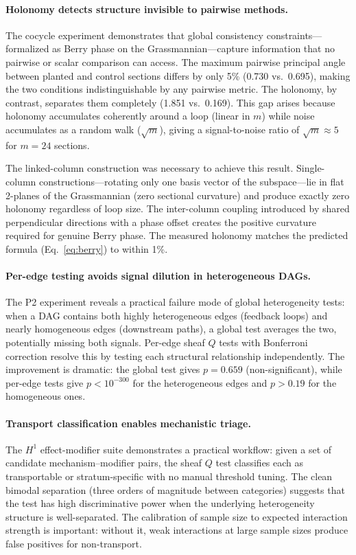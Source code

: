 \documentclass[11pt]{article}
\begin{document}
\paragraph{Holonomy detects structure invisible to pairwise methods.}
The cocycle experiment demonstrates that global consistency
constraints---formalized as Berry phase on the
Grassmannian---capture information that no pairwise or scalar comparison
can access. The maximum pairwise principal angle between planted and
control sections differs by only 5\% (0.730 vs.\ 0.695), making the two
conditions indistinguishable by any pairwise metric. The holonomy, by
contrast, separates them completely (1.851 vs.\ 0.169). This gap arises
because holonomy accumulates coherently around a loop (linear in $m$)
while noise accumulates as a random walk ($\sqrt{m}$), giving a
signal-to-noise ratio of $\sqrt{m} \approx 5$ for $m = 24$ sections.

The linked-column construction was necessary to achieve this result.
Single-column constructions---rotating only one basis vector of the
subspace---lie in flat 2-planes of the Grassmannian (zero sectional
curvature) and produce exactly zero holonomy regardless of loop size.
The inter-column coupling introduced by shared perpendicular directions
with a phase offset creates the positive curvature required for genuine
Berry phase. The measured holonomy matches the predicted formula
(Eq.~\ref{eq:berry}) to within 1\%.

\paragraph{Per-edge testing avoids signal dilution in heterogeneous DAGs.}
The P2 experiment reveals a practical failure mode of global
heterogeneity tests: when a DAG contains both highly heterogeneous
edges (feedback loops) and nearly homogeneous edges (downstream paths),
a global test averages the two, potentially missing both signals.
Per-edge sheaf $Q$ tests with Bonferroni correction resolve this by
testing each structural relationship independently. The improvement is
dramatic: the global test gives $p = 0.659$ (non-significant), while
per-edge tests give $p < 10^{-300}$ for the heterogeneous edges and
$p > 0.19$ for the homogeneous ones.

\paragraph{Transport classification enables mechanistic triage.}
The $H^1$ effect-modifier suite demonstrates a practical workflow:
given a set of candidate mechanism--modifier pairs, the sheaf $Q$ test
classifies each as transportable or stratum-specific with no manual
threshold tuning. The clean bimodal separation (three orders of
magnitude between categories) suggests that the test has high
discriminative power when the underlying heterogeneity structure is
well-separated. The calibration of sample size to expected interaction
strength is important: without it, weak interactions at large sample
sizes produce false positives for non-transport.
\end{document}
